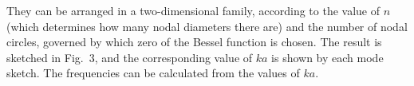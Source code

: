   They can be arranged in a two-dimensional family, according to the value of 
  $n$ (which determines how many nodal diameters there are) and the number of 
  nodal circles, governed by which zero of the Bessel function is chosen. The 
  result is sketched in Fig.\ 3, and the corresponding value of $ka$ is shown 
  by each mode sketch. The frequencies can be calculated from the values of 
  $ka$. 


